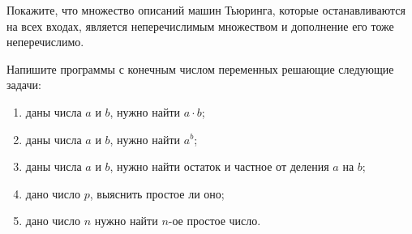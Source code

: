 \breakline


\begin{ptask}{14}
    Покажите, что множество описаний машин Тьюринга, которые останавливаются на всех входах, является неперечислимым множеством и
    дополнение его тоже неперечислимо.
\end{ptask}

\begin{ptask}{16}
	Напишите программы с конечным числом переменных решающие следующие задачи:
	\begin{enumerate}
		\item даны числа $a$ и $b$, нужно найти $a \cdot b$;
		\item даны числа $a$ и $b$, нужно найти $a^b$;
		\item даны числа $a$ и $b$, нужно найти остаток и частное от деления $a$ на $b$;
		\item дано число $p$, выяснить простое ли оно;
		\item дано число $n$ нужно найти $n$-ое простое число.
	\end{enumerate}
\end{ptask}


